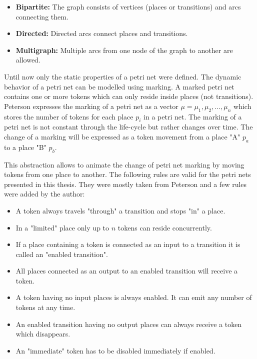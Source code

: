 \begin{itemize}
    \item \textbf{Bipartite:} The graph consists of vertices (places or transitions) and arcs connecting them.
    \item \textbf{Directed:} Directed arcs connect places and transitions.
    \item \textbf{Multigraph:} Multiple arcs from one node of the graph to another are allowed.
\end{itemize}

Until now only the static properties of a petri net were defined. The dynamic behavior of a petri net can be modelled using marking. A marked petri net contains one or more tokens which can only reside inside places (not transitions). Peterson \cite{peterson} expresses the marking of a petri net as a vector $\mu = {\mu_1, \mu_2, \dots, \mu_n}$ which stores the number of tokens for each place $p_i$ in a petri net. The marking of a petri net is not constant through the life-cycle but rather changes over time. The change of a marking will be expressed as a token movement from a place "A" $p_a$ to a place "B" $p_b$.

This abstraction allows to animate the change of petri net marking by moving tokens from one place to another. The following rules are valid for the petri nets presented in this thesis. They were mostly taken from Peterson \cite{peterson} and a few rules were added by the author:

\begin{itemize}
    \item A token always travels "through" a transition and stops "in" a place.
    \item In a "limited" place only up to $n$ tokens can reside concurrently.
    \item If a place containing a token is connected as an input to a transition it is called an "enabled transition".
    \item All places connected as an output to an enabled transition will receive a token.
    \item A token having no input places is always enabled. It can emit any number of tokens at any time.
    \item An enabled transition having no output places can always receive a token which disappears.
    \item An "immediate" token has to be disabled immediately if enabled.
\end{itemize}


